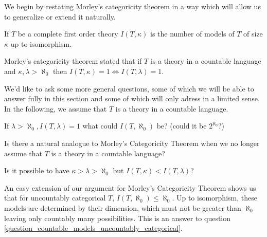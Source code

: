 We begin by restating Morley's categoricity theorem in a way which will allow us to generalize or extend it naturally.

\begin{definition}\label{definition_number_models}
If \(T\) be a complete first order theory \(I(T, \kappa)\) is the number of models of \(T\) of size \(\kappa\) up to isomorphism.
\end{definition}

Morley's categoricity theorem stated that if \(T\) is a theory in a countable language and \(\kappa, \lambda > \aleph_0\) then \(I(T, \kappa) = 1 \iff I(T, \lambda) = 1\). 

We'd like to ask some more general questions, some of which we will be able to answer fully in this section and some of which will only adress in a limited sense. 
In the following, we assume that \(T\) is a theory in a countable language. 

\begin{question}\label{question_countable_models_uncountably_categorical}
If \(\lambda > \aleph_0, I(T, \lambda) = 1\) what could \(I(T, \aleph_0)\) be? (could it be \(2^{\aleph_0}\)?)
\end{question}


\begin{question}\label{question_los_conjecture_uncountable_languages}
Is there a natural analogue to Morley's Categoricity Theorem when we no longer assume that \(T\) is a theory in a countable language?
\end{question}

\begin{question}\label{question_morleys_conjecture}
Is it possible to have \(\kappa > \lambda > \aleph_0\) but \(I(T, \kappa) < I(T, \lambda)\)?
\end{question}

An easy extension of our argument for Morley's Categoricity Theorem shows us that for uncountably categorical \(T\), \(I(T, \aleph_0)\leq \aleph_0\).
Up to isomorphism, these models are determined by their dimension, which must not be greater than \(\aleph_0\) leaving only countably many possibilities. 
This is an answer to question \ref{question_countable_models_uncountably_categorical}.

